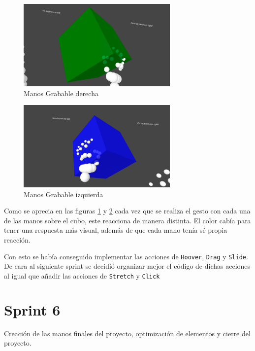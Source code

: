 \documentclass[a4paper, 12pt]{book}
\begin{document}
\begin{figure}[H] 
  \centering
  \includegraphics[width=0.7\textwidth]{img/grabable_right.jpg} 
  \caption{Manos Grabable derecha}
  \label{fig:sprint5-1}
\end{figure}

\begin{figure}[H] 
  \centering
  \includegraphics[width=0.7\textwidth]{img/grabable_left.jpg} 
  \caption{Manos Grabable izquierda}
  \label{fig:sprint5-2}
\end{figure}

Como se aprecia en las figuras \ref{fig:sprint5-1} y \ref{fig:sprint5-2} cada vez que se realiza el gesto con cada una de las manos sobre el cubo, este reacciona de manera distinta. 
El color cabía para tener una respuesta más visual, además de que cada mano tenía sé propia reacción. 

Con esto se había conseguido implementar las acciones de \texttt{Hoover}, \texttt{Drag} y \texttt{Slide}. De cara al siguiente sprint se decidió organizar mejor el código de dichas acciones al igual que añadir las acciones de \texttt{Stretch} y \texttt{Click}

\section{Sprint 6}
\label{sec:sprint6}
Creación de las manos finales del proyecto, optimización de elementos y cierre del proyecto.
\end{document}
